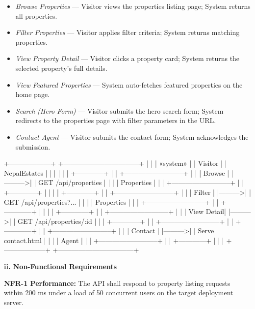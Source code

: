 \documentclass[12pt,a4paper]{report}
\begin{document}
\begin{itemize}
  \item \textbullet{} \textit{Browse Properties} --- Visitor views the properties listing page; System returns all properties.
  \item \textbullet{} \textit{Filter Properties} --- Visitor applies filter criteria; System returns matching properties.
  \item \textbullet{} \textit{View Property Detail} --- Visitor clicks a property card; System returns the selected property's full details.
  \item \textbullet{} \textit{View Featured Properties} --- System auto-fetches featured properties on the home page.
  \item \textbullet{} \textit{Search (Hero Form)} --- Visitor submits the hero search form; System redirects to the properties page with filter parameters in the URL.
  \item \textbullet{} \textit{Contact Agent} --- Visitor submits the contact form; System acknowledges the submission.
\end{itemize}
+------------------+          +---------------------------------+
|                  |          |         «system»                |
|     Visitor      |          |         NepalEstates            |
|                  |          |                                 |
|  +------------+  |          |  +--------------------------+  |
|  | Browse     |  |--------->|  | GET /api/properties      |  |
|  | Properties |  |          |  +--------------------------+  |
|  +------------+  |          |                                 |
|  +------------+  |          |  +--------------------------+  |
|  | Filter     |  |--------->|  | GET /api/properties?...  |  |
|  | Properties |  |          |  +--------------------------+  |
|  +------------+  |          |                                 |
|  +------------+  |          |  +--------------------------+  |
|  | View Detail|  |--------->|  | GET /api/properties/:id  |  |
|  +------------+  |          |  +--------------------------+  |
|  +------------+  |          |  +--------------------------+  |
|  | Contact    |  |--------->|  | Serve contact.html       |  |
|  | Agent      |  |          |  +--------------------------+  |
|  +------------+  |          |                                 |
+------------------+          +---------------------------------+

\textbf{ii. Non-Functional Requirements}

\textbf{NFR-1 Performance:} The API shall respond to property listing requests within 200 ms under a load of 50 concurrent users on the target deployment server.
\end{document}
